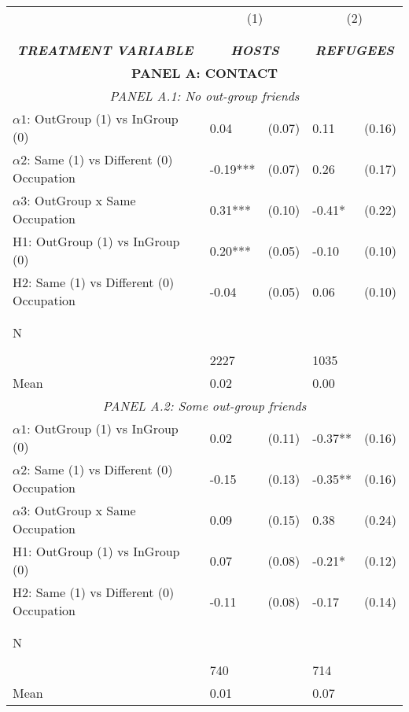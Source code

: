 \begin{tabular}{l*{4}{l}} \toprule 
                &\multicolumn{2}{c}{(1)}&\multicolumn{2}{c}{(2)}\\
                &\multicolumn{2}{c}{ } &\multicolumn{2}{c}{ } \\
\\[-0.6cm] \multicolumn{1}{c}{\textit{\textbf{TREATMENT VARIABLE}}} & \multicolumn{2}{c}{\textit{\textbf{HOSTS}}} & \multicolumn{2}{c}{\textit{\textbf{REFUGEES}}} \\ \midrule   \multicolumn{5}{c}{\textbf{PANEL A: CONTACT}} \\ \multicolumn{5}{c}{\textit{PANEL A.1: No out-group friends}} \\  \midrule  
$\alpha1$: OutGroup (1) vs InGroup (0)&     0.04   &   (0.07)&     0.11   &   (0.16)\\
$\alpha2$: Same (1) vs Different (0) Occupation&    -0.19***&   (0.07)&     0.26   &   (0.17)\\
 
$\alpha3$: OutGroup x Same Occupation&     0.31***&   (0.10)&    -0.41*  &   (0.22)\\
 
H1: OutGroup (1) vs InGroup (0)&     0.20***&   (0.05)&    -0.10   &   (0.10)\\
 
H2: Same (1) vs Different (0) Occupation&    -0.04   &   (0.05)&     0.06   &   (0.10)\\
 
  \\\\[-0.5cm] N \\\\[-0.6cm]&     2227   &         &     1035   &         \\
Mean            &     0.02&         &     0.00&         \\
 
  \multicolumn{5}{c}{\textit{PANEL A.2: Some out-group friends}} \\  \midrule  
$\alpha1$: OutGroup (1) vs InGroup (0)&        0.02   &      (0.11)&       -0.37** &      (0.16)\\
$\alpha2$: Same (1) vs Different (0) Occupation&       -0.15   &      (0.13)&       -0.35** &      (0.16)\\
 
$\alpha3$: OutGroup x Same Occupation&     0.09   &   (0.15)&     0.38   &   (0.24)\\
 
H1: OutGroup (1) vs InGroup (0)&     0.07   &   (0.08)&    -0.21*  &   (0.12)\\
 
H2: Same (1) vs Different (0) Occupation&    -0.11   &   (0.08)&    -0.17   &   (0.14)\\
 
  \\\\[-0.5cm] N \\\\[-0.6cm]&      740   &         &      714   &         \\
Mean            &     0.01&         &     0.07&         \\
 
\bottomrule  \end{tabular}  
